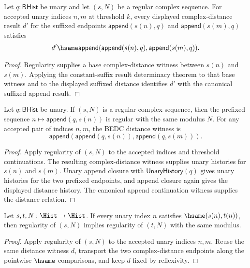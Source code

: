 \begin{theorem}
\label{thm:complex-regular-sequence-append-constant-result-deterministic}
Let \(q:\mathsf{BHist}\) be unary and let \((s,N)\) be a regular complex
sequence. For accepted unary indices \(n,m\) at threshold \(k\), every displayed
complex-distance result \(d'\) for the suffixed endpoints
\(\mathsf{append}(s(n),q)\) and \(\mathsf{append}(s(m),q)\) satisfies
$$
d' \hsame
\mathsf{append}(\mathsf{append}(s(n),q),\mathsf{append}(s(m),q)).
$$
\end{theorem}
\begin{proof}
Regularity supplies a base complex-distance witness between \(s(n)\) and
\(s(m)\). Applying the constant-suffix result determinacy theorem to that base
witness and to the displayed suffixed distance identifies \(d'\) with the
canonical suffixed append result.
\end{proof}

\begin{theorem}
\label{lem:complex-regular-sequence-prepend-constant-closed}
Let $q:\mathsf{BHist}$ be unary. If $(s,N)$ is a regular complex sequence,
then the prefixed sequence $n\mapsto\mathsf{append}(q,s(n))$ is regular with
the same modulus $N$. For any accepted pair of indices $n,m$, the BEDC distance
witness is
$$
\mathsf{append}(\mathsf{append}(q,s(n)),\mathsf{append}(q,s(m))).
$$
\end{theorem}
\begin{proof}
Apply regularity of $(s,N)$ to the accepted indices and threshold
continuations. The resulting complex-distance witness supplies unary histories
for $s(n)$ and $s(m)$. Unary append closure with $\mathsf{UnaryHistory}(q)$
gives unary histories for the two prefixed endpoints, and append closure again
gives the displayed distance history. The canonical append continuation
witness supplies the distance relation.
\end{proof}

\begin{theorem}
\label{thm:complex-regular-sequence-hsame-transport}
Let \(s,t,N:\Hist\to\Hist\). If every unary index \(n\) satisfies
\(\hsame(s(n),t(n))\), then regularity of \((s,N)\) implies regularity of
\((t,N)\) with the same modulus.
\end{theorem}
\begin{proof}
Apply regularity of \((s,N)\) to the accepted unary indices \(n,m\). Reuse the
same distance witness \(d\), transport the two complex-distance endpoints along
the pointwise \(\hsame\) comparisons, and keep \(d\) fixed by reflexivity.
\end{proof}

